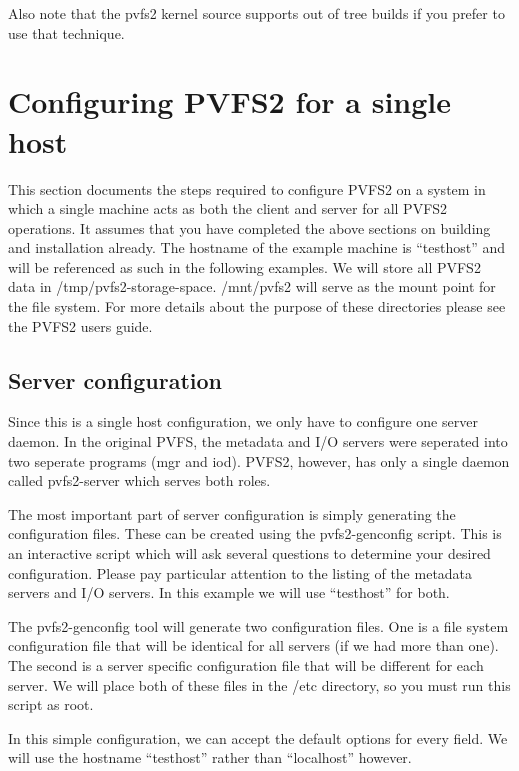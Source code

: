 \documentclass[11pt, letterpaper]{article}
\begin{document}
Also note that the pvfs2 kernel source supports out of tree builds if you 
prefer to use that technique.

\section{Configuring PVFS2 for a single host}

This section documents the steps required to configure PVFS2 on a system
in which a single machine acts as both the client and server for all
PVFS2 operations.  It assumes that you have completed the above sections
on building and installation already.  The hostname of the example machine
is ``testhost'' and will be referenced as such in the following examples.
We will store all PVFS2 data in /tmp/pvfs2-storage-space.  /mnt/pvfs2 will
serve as the mount point for the file system.  For more details about
the purpose of these directories please see the PVFS2 users guide.

\subsection{Server configuration}

Since this is a single host configuration, we only have to configure one
server daemon.  In the original PVFS, the metadata and I/O servers were 
seperated into two seperate programs (mgr and iod).  PVFS2, however, has 
only a single daemon called pvfs2-server which serves both roles.

The most important part of server configuration is simply generating the 
configuration files.  These can be created using the pvfs2-genconfig 
script.  This is an interactive script which will ask several questions
to determine your desired configuration.  Please pay particular attention
to the listing of the metadata servers and I/O servers.  
In this example we will use ``testhost'' for both.  

The pvfs2-genconfig tool will generate two configuration files.  One is a file system configuration file that will be identical for all servers (if we had more than
one).  The second is a server specific configuration file that will be different for
each server.  We will place both of these files in the /etc directory, so you must run this script as root.  

In this simple configuration, we can accept the default options for every
field.  We will use the hostname ``testhost'' rather than ``localhost'' however.
\end{document}
